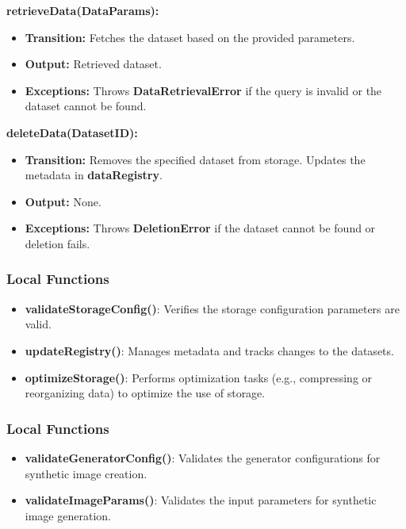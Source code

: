 \documentclass[12pt, titlepage]{article}
\begin{document}
\noindent \textbf{retrieveData(DataParams):}
\begin{itemize}
    \item \textbf{Transition:} Fetches the dataset based on the provided parameters.
    \item \textbf{Output:} Retrieved dataset.
    \item \textbf{Exceptions:} Throws \textbf{DataRetrievalError} if the query is invalid or the dataset cannot be found.
\end{itemize}

\noindent \textbf{deleteData(DatasetID):}
\begin{itemize}
    \item \textbf{Transition:} Removes the specified dataset from storage. Updates the metadata in \textbf{dataRegistry}.
    \item \textbf{Output:} None.
    \item \textbf{Exceptions:} Throws \textbf{DeletionError} if the dataset cannot be found or deletion fails.
\end{itemize}

\subsubsection{Local Functions}
\begin{itemize}
    \item \textbf{validateStorageConfig()}: Verifies the storage configuration parameters are valid.
    \item \textbf{updateRegistry()}: Manages metadata and tracks changes to the datasets.
    \item \textbf{optimizeStorage()}: Performs optimization tasks (e.g., compressing or reorganizing data) to optimize the use of storage.
\end{itemize}


\subsubsection{Local Functions}
\begin{itemize}
    \item \textbf{validateGeneratorConfig()}: Validates the generator configurations for synthetic image creation.
    \item \textbf{validateImageParams()}: Validates the input parameters for synthetic image generation.
\end{itemize}


\newpage
\end{document}
